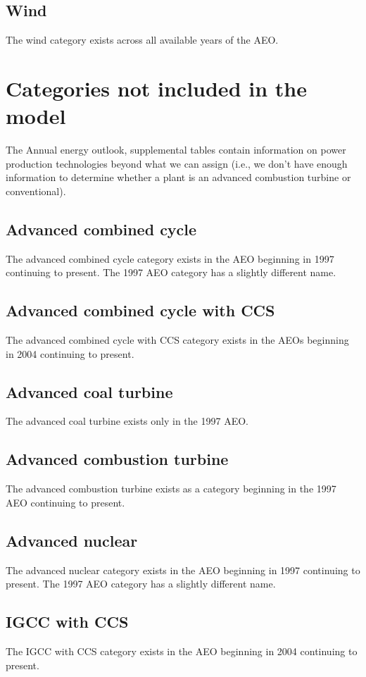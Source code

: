 \documentclass[10pt]{report}
\begin{document}
\subsection{Wind}
The wind category exists across all available years of the AEO. 


\section{Categories not included in the model}
The Annual energy outlook, supplemental tables contain information on power production technologies beyond what we can assign (i.e., we don't have enough information to determine whether a plant is an advanced combustion turbine or conventional). 

\subsection{Advanced combined cycle}
The advanced combined cycle category exists in the AEO beginning in 1997 continuing to present.
The 1997 AEO category has a slightly different name.  

\subsection{Advanced combined cycle with CCS}
The advanced combined cycle with CCS category exists in the AEOs beginning in 2004 continuing to present.

\subsection{Advanced coal turbine}
The advanced coal turbine exists only in the 1997 AEO. 

\subsection{Advanced combustion turbine}
The advanced combustion turbine exists as a category beginning in the 1997 AEO continuing to present. 

\subsection{Advanced nuclear}
The advanced nuclear category exists in the AEO beginning in 1997 continuing to present. 
The 1997 AEO category has a slightly different name. 

\subsection{IGCC with CCS}
The IGCC with CCS category exists in the AEO beginning in 2004 continuing to present. 
\end{document}
